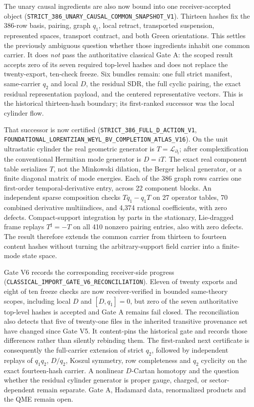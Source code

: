 \documentclass[11pt]{article}
\theoremstyle{definition}
\theoremstyle{remark}
\newcommand{\cert}[1]{\nolinkurl{#1}}
\begin{document}
The unary causal ingredients are also now bound into one receiver-accepted
object
(\cert{STRICT_386_UNARY_CAUSAL_COMMON_SNAPSHOT_V1}).  Thirteen hashes fix the
386-row basis, pairing, graph \(q_1\), local retract, transported suspension,
represented spaces, transport contract, and both Green orientations.  This
settles the previously ambiguous question whether those ingredients inhabit
one common carrier.  It does \emph{not} pass the authoritative classical Gate
A: the scoped result accepts zero of its seven required top-level hashes and
does not replace the twenty-export, ten-check freeze.  Six bundles remain:
one full strict manifest, same-carrier \(q_2\) and local \(D\), the residual
SDR, the full cyclic pairing, the exact residual representation payload, and
the centered representative vectors.  This is the historical thirteen-hash
boundary; its first-ranked successor was the local cylinder flow.

That successor is now certified
(\cert{STRICT_386_FULL_D_ACTION_V1},
\cert{FOUNDATIONAL_LORENTZIAN_WEYL_BV_COMPLETION_ATLAS_V16}).  On the unit
ultrastatic cylinder the real geometric generator is
\(T=\mathcal L_{\partial_t}\); after complexification the conventional
Hermitian mode generator is \(D=iT\).  The exact real component table
serializes \(T\), not the Minkowski dilation, the Berger helical generator, or
a finite diagonal matrix of mode energies.  Each of the 386 graph rows carries
one first-order temporal-derivative entry, across 22 component blocks.  An
independent sparse composition checks \(Tq_1-q_1T\) on 27 operator tables, 70
combined derivative multiindices, and 4,374 rational coefficients, with zero
defects.  Compact-support integration by parts in the stationary,
Lie-dragged frame replays \(T^\sharp=-T\) on all 410 nonzero pairing entries,
also with zero defects.  The result therefore extends the common carrier from
thirteen to fourteen content hashes without turning the arbitrary-support
field carrier into a finite-mode state space.

Gate V6 records the corresponding receiver-side progress
(\cert{CLASSICAL_IMPORT_GATE_V6_RECONCILIATION}).  Eleven of twenty exports
and eight of ten freeze checks are now receiver-verified in bounded
same-theory scopes, including local \(D\) and \([D,q_1]=0\), but zero of the
seven authoritative top-level hashes is accepted and Gate A remains
fail closed.  The reconciliation also detects that five of twenty-one files
in the inherited transitive provenance set have changed since Gate V5.  It
content-pins the historical gate and records those differences rather than
silently rebinding them.  The first-ranked next certificate is consequently
the full-carrier extension of strict \(q_2\), followed by independent replays
of \(q_1q_2\), \(D/q_2\), Koszul symmetry, row completeness and \(q_2\)
cyclicity on the exact fourteen-hash carrier.  A nonlinear \(D\)-Cartan
homotopy and the question whether the residual cylinder generator is proper
gauge, charged, or sector-dependent remain separate.  Gate A, Hadamard data,
renormalized products and the QME remain open.
\end{document}
